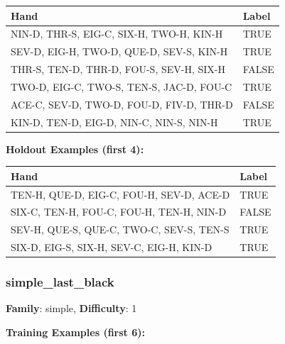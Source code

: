 \documentclass[10pt,a4paper]{article}
\begin{document}
\begin{small}
\begin{tabular}{p{8cm}l}
\toprule
Hand & Label \\
\midrule
NIN-D, THR-S, EIG-C, SIX-H, TWO-H, KIN-H & \textcolor{positive}{TRUE} \\
SEV-D, EIG-H, TWO-D, QUE-D, SEV-S, KIN-H & \textcolor{positive}{TRUE} \\
THR-S, TEN-D, THR-D, FOU-S, SEV-H, SIX-H & \textcolor{negative}{FALSE} \\
TWO-D, EIG-C, TWO-S, TEN-S, JAC-D, FOU-C & \textcolor{positive}{TRUE} \\
ACE-C, SEV-D, TWO-D, FOU-D, FIV-D, THR-D & \textcolor{negative}{FALSE} \\
KIN-D, TEN-D, EIG-D, NIN-C, NIN-S, NIN-H & \textcolor{positive}{TRUE} \\
\bottomrule
\end{tabular}
\end{small}

\textbf{Holdout Examples (first 4):}

\begin{small}
\begin{tabular}{p{8cm}l}
\toprule
Hand & Label \\
\midrule
TEN-H, QUE-D, EIG-C, FOU-H, SEV-D, ACE-D & \textcolor{positive}{TRUE} \\
SIX-C, TEN-H, FOU-C, FOU-H, TEN-H, NIN-D & \textcolor{negative}{FALSE} \\
SEV-H, QUE-S, QUE-C, TWO-C, SEV-S, TEN-S & \textcolor{positive}{TRUE} \\
SIX-D, EIG-S, SIX-H, SEV-C, EIG-H, KIN-D & \textcolor{positive}{TRUE} \\
\bottomrule
\end{tabular}
\end{small}

\vspace{0.5cm}

\subsubsection{simple\_last\_black}

\textbf{Family}: simple, \textbf{Difficulty}: 1

\textbf{Training Examples (first 6):}
\end{document}
